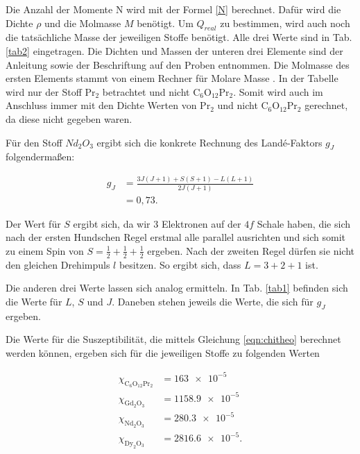 \noindent Die Anzahl der Momente N wird mit der Formel \eqref{N} berechnet. Dafür wird die Dichte $\rho$ und die Molmasse $M$ benötigt. Um $Q_{real}$ zu bestimmen, wird auch noch die tatsächliche Masse der jeweiligen Stoffe benötigt. Alle drei Werte sind in Tab. \ref{tab2} eingetragen.
Die Dichten und Massen der unteren drei Elemente sind der Anleitung \cite{V606} sowie der Beschriftung auf den Proben entnommen.
Die Molmasse des ersten Elements stammt von einem Rechner für Molare Masse \cite{C6}. In der Tabelle wird nur der Stoff $\text{Pr}_2$ betrachtet und nicht $\text{C}_6 \text{O}_{12} \text{Pr}_2$. Somit wird auch im Anschluss immer mit den Dichte Werten von $\text{Pr}_2$ und nicht $\text{C}_6 \text{O}_{12} \text{Pr}_2$ gerechnet, da diese nicht gegeben waren. %


\noindent Für den Stoff $Nd_2 O_3$ ergibt sich die konkrete Rechnung des Landé-Faktors $g_J$ folgendermaßen: 

\begin{align*}
    g_J &= \frac{3 J (J+1) + S (S+1) - L (L+1)}{2 J (J+1)} \\
        &= 0,73.
\end{align*} 

\noindent Der Wert für $S$ ergibt sich, da wir \num{3} Elektronen auf der $4f$ Schale haben, die sich nach der ersten Hundschen Regel erstmal alle parallel ausrichten und sich somit zu einem Spin von $S = \frac{1}{2}+ \frac{1}{2} + \frac{1}{2}$ ergeben. Nach der zweiten Regel dürfen sie nicht den gleichen Drehimpuls $l$ besitzen. So ergibt sich, dass $L = 3 + 2 + 1$ ist. 

\noindent Die anderen drei Werte lassen sich analog ermitteln. 
In Tab. \ref{tab1} befinden sich die Werte für $L$, $S$ und $J$. Daneben stehen jeweils die Werte, die sich für 
$g_J$ ergeben. 


\noindent Die Werte für die Suszeptibilität, die mittels Gleichung \eqref{eqn:chitheo} berechnet werden können, ergeben sich für die jeweiligen Stoffe 
zu folgenden Werten 

\begin{align*}
   \chi_{\text{C}_6 \text{O}_{12} \text{Pr}_2} &= \num{163e-5}\\ %
   \chi_{\text{Gd}_2 \text{O}_3} &= \num{1158.9e-5}\\
   \chi_{\text{Nd}_2 \text{O}_3} &= \num{280.3e-5}\\
   \chi_{\text{Dy}_2 \text{O}_3} &= \num{2816.6e-5}.
\end{align*}

